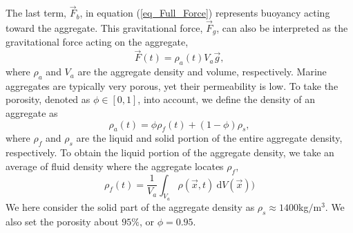 The last term, $\vec{F}_b$, in equation (\ref{eq_Full_Force}) represents buoyancy acting toward the aggregate. 
This gravitational force, $\vec{F}_g$, can also be interpreted as the gravitational force acting on the aggregate,
\begin{equation}
	\vec{F}(t) = \rho_a(t) V_a \vec{g}, 
\end{equation}
where $\rho_a$  and $V_a$ are the aggregate density and volume, respectively. 
Marine aggregates are typically very porous, yet their permeability is low. To take the porosity, denoted as $\phi \in [0,1]$, into account, we define the density of an aggregate as 
\begin{equation}
	\rho_a (t) = \phi \rho_{f}(t) + (1-\phi) \rho_{s},
	\label{eq_rho_a}
\end{equation}
where $\rho_{f}$ and $\rho_s$ are the liquid and solid portion of the entire aggregate density, respectively. To obtain the liquid portion of the aggregate density, we take an average of fluid density where the aggregate locates $\rho_{f},$
\begin{equation}
	\rho_{f}(t) = \frac{1}{V_a}\int_{V_a} \rho(\vec{x}, t) \  \textrm{d}V(\vec{x}))
\end{equation}
We here consider the solid part of the aggregate density as $\rho_s \approx 1400 $kg$/$m$^3.$ 
We also set the porosity about $95\%$, or $\phi = 0.95$.


